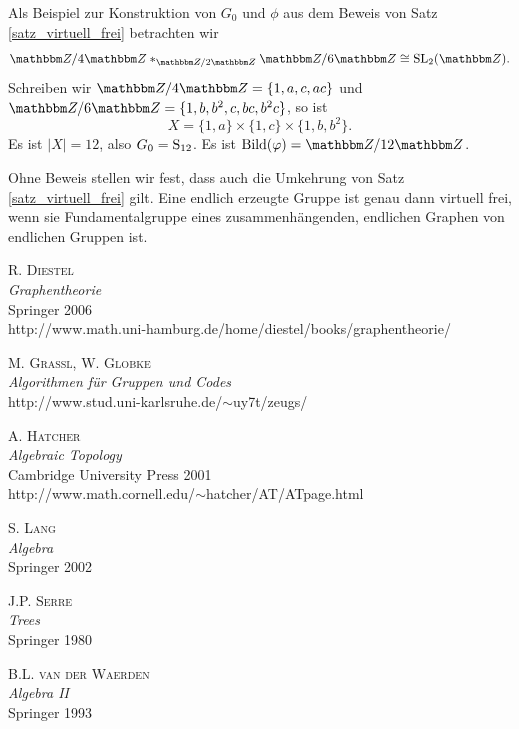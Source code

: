 \documentclass[a4paper, 12pt, twoside]{article}
\begin{document}
\BSP Als Beispiel zur Konstruktion von $G_0$ und $\phi$ aus
dem Beweis von Satz \ref{satz_virtuell_frei} betrachten wir
\[
\ZZ/4\ZZ *_{\ZZ/2\ZZ} \ZZ/6\ZZ \cong \SL_2(\ZZ).
\]
Schreiben wir $\ZZ/4\ZZ=\{1,a,c,ac\}$ und
$\ZZ/6\ZZ=\{1,b,b^2,c,bc,b^2c\}$, so ist
\[
X = \{1,a\} \times \{1,c\} \times \{1,b,b^2\}.
\]
Es ist $|X|=12$, also $G_0=\mathrm{S}_{12}$. Es ist $\B{\phi}=\ZZ/12\ZZ$.

Ohne Beweis stellen wir fest, dass auch die Umkehrung
von Satz \ref{satz_virtuell_frei} gilt.
\SATZ Eine endlich erzeugte Gruppe ist genau dann virtuell frei,
wenn sie Fundamentalgruppe eines zusammenhängenden, endlichen
Graphen von endlichen Gruppen ist.


\newpage
\begin{thebibliography}{10}

 \textsc{R. Diestel}\\
\textsl{Graphentheorie}\\
Springer 2006\\
\textsf{http://www.math.uni-hamburg.de/home/diestel/books/graphentheorie/}

 \textsc{M. Grassl, W. Globke}\\
\textsl{Algorithmen für Gruppen und Codes}\\
\textsf{http://www.stud.uni-karlsruhe.de/$\sim$uy7t/zeugs/}

 \textsc{A. Hatcher}\\
\textsl{Algebraic Topology}\\
Cambridge University Press 2001\\
\textsf{http://www.math.cornell.edu/$\sim$hatcher/AT/ATpage.html}

 \textsc{S. Lang}\\
\textsl{Algebra}\\
Springer 2002

 \textsc{J.P. Serre}\\
\textsl{Trees}\\
Springer 1980

 \textsc{B.L. van der Waerden}\\
\textsl{Algebra II}\\
Springer 1993

\end{thebibliography}

\newpage
{}
\small
\printindex
\end{document}
